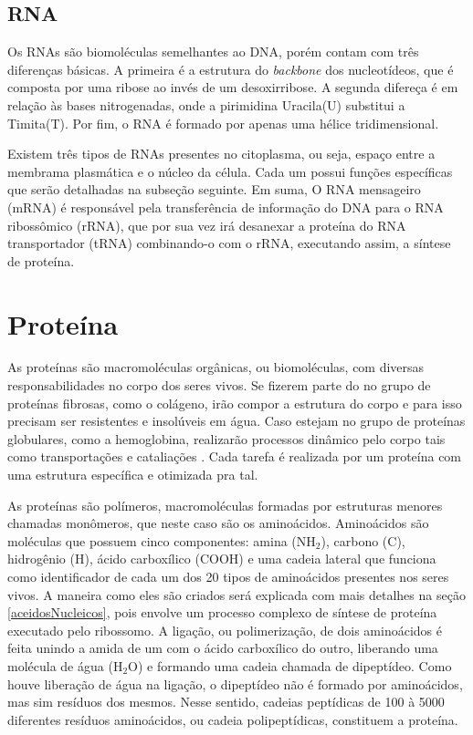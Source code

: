 \subsection{RNA} \label{aceidosNucleicos:rna}

\indent Os RNAs são biomoléculas semelhantes ao DNA, porém contam com três diferenças básicas. A primeira é a estrutura do \textit{backbone} dos nucleotídeos, 
que é composta por uma ribose ao invés de um desoxirribose. A segunda difereça é em relação às bases nitrogenadas, onde a pirimidina Uracila(U) substitui a Timita(T). 
Por fim, o RNA é formado por apenas uma hélice tridimensional.

\indent Existem três tipos de RNAs presentes no citoplasma, ou seja, espaço entre a membrama plasmática e o núcleo da célula. 
Cada um possui funções específicas que serão detalhadas na subseção seguinte. Em suma, O RNA mensageiro (mRNA) é responsável pela transferência de informação do DNA para o RNA ribossômico (rRNA), que por sua vez irá desanexar a proteína do RNA transportador (tRNA) combinando-o com o rRNA, executando assim, a síntese de proteína.




\section{Proteína} \label{proteina}

\indent As proteínas são macromoléculas orgânicas, ou biomoléculas, com diversas responsabilidades no corpo dos seres vivos. 
Se fizerem parte do no grupo de proteínas fibrosas, como o colágeno, irão compor a estrutura do corpo e para isso precisam ser resistentes e insolúveis em água. Caso estejam no grupo de proteínas globulares, como a hemoglobina, realizarão processos dinâmico pelo corpo tais como transportações e cataliações \cite{profangela11}.  Cada tarefa é realizada por um proteína com uma estrutura específica e otimizada pra tal.


\indent As proteínas são polímeros, macromoléculas formadas por estruturas menores chamadas monômeros, que neste caso são os aminoácidos. Aminoácidos são moléculas que possuem cinco componentes: amina (NH$_{2}$), carbono (C), hidrogênio (H), ácido carboxílico (COOH) e uma cadeia lateral que funciona como identificador de cada um dos 20 tipos de aminoácidos presentes nos seres vivos. A maneira como eles são criados será explicada com mais detalhes na seção \ref{aceidosNucleicos}, pois envolve um processo complexo de síntese de proteína executado pelo ribossomo. A ligação, ou polimerização, de dois aminoácidos é feita unindo a amida de um com o ácido carboxílico do outro, liberando uma molécula de água (H$_{2}$O) e formando uma cadeia chamada de dipeptídeo. Como houve liberação de água na ligação, o dipeptídeo não é formado por aminoácidos, mas sim resíduos dos mesmos. Nesse sentido, cadeias peptídicas de 100 à 5000 diferentes resíduos aminoácidos, ou cadeia polipeptídicas,  constituem a proteína.

